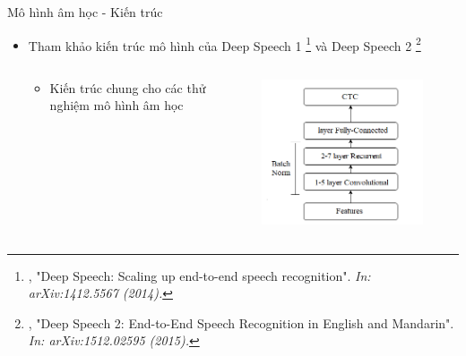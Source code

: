 \documentclass[10pt,a4paper,openany]{beamer}
\begin{document}
	\begin{frame}{Mô hình âm học - Kiến trúc}  \pause
		\begin{itemize}
			\item Tham khảo kiến trúc mô hình của Deep Speech 1 \footnote{, "Deep Speech: Scaling up end-to-end speech recognition". \emph{\color{blue} In: 	arXiv:1412.5567 (2014).}} và Deep Speech 2 \footnote{, "Deep Speech 2: End-to-End Speech Recognition in English and Mandarin". \emph{\color{blue} In: arXiv:1512.02595 (2015).}}  \pause
			\begin{columns}
				\begin{column}{0.5\textwidth}
					\begin{itemize}
						\item Kiến trúc chung cho các thử nghiệm mô hình âm học 
					\end{itemize}
				\end{column}
				\begin{column}{0.5\textwidth}
					\begin{figure}[htbp]
						\includegraphics[scale=0.55]{charts/architecture.png}
						\label{fig_architecture}
					\end{figure}
				\end{column}
			\end{columns}					
		\end{itemize}		
	\end{frame}
	
\end{document}
